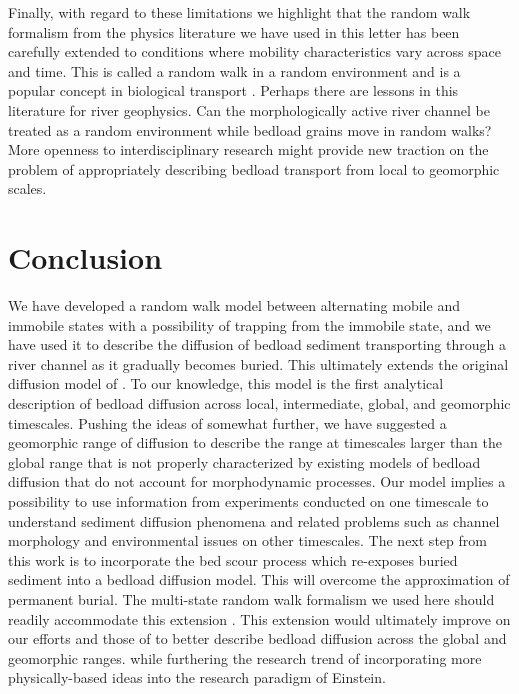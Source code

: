 \documentclass[]{agujournal2018}
\begin{document}
Finally, with regard to these limitations we highlight that the random walk formalism from the physics literature we have used in this letter \citep{Weiss1994} has been carefully extended to conditions where mobility characteristics vary across space and time. This is called a random walk in a random environment and is a popular concept in biological transport \citep[e.g.][]{Codling2008}. Perhaps there are lessons in this literature for river geophysics. Can the morphologically active river channel be treated as a random environment while bedload grains move in random walks?
More openness to interdisciplinary research might provide new traction on the problem of appropriately describing bedload transport from local to geomorphic scales.

\section{Conclusion}
\label{sec:conclusion}
We have developed a random walk model between alternating mobile and immobile states with a possibility of trapping from the immobile state, and we have used it to describe the diffusion of bedload sediment transporting through a river channel as it gradually becomes buried.
This ultimately extends the original diffusion model of \citet{Einstein1937}.
To our knowledge, this model is the first analytical description of bedload diffusion across local, intermediate, global, and geomorphic timescales.
Pushing the ideas of \citet{Nikora2002} somewhat further, we have suggested a geomorphic range of diffusion to describe the range at timescales larger than the global range that is not properly characterized by existing models of bedload diffusion that do not account for morphodynamic processes.
Our model implies a possibility to use information from experiments conducted on one timescale to understand sediment diffusion phenomena and related problems such as channel morphology \citep[e.g.][]{Church2006, Hassan2017} and environmental issues \citep[e.g.][]{Macklin2006,Gaeuman2017} on other timescales.
The next step from this work is to incorporate the bed scour process which re-exposes buried sediment into a bedload diffusion model.
This will overcome the approximation of permanent burial. 
The multi-state random walk formalism we used here should readily accommodate this extension \citep[e.g.][]{Weiss1994}.
This extension would ultimately improve on our efforts and those of \citet{Wu2019} to better describe bedload diffusion across the global and geomorphic ranges.
 while furthering the research trend of incorporating more physically-based ideas into the research paradigm of Einstein.
\end{document}
